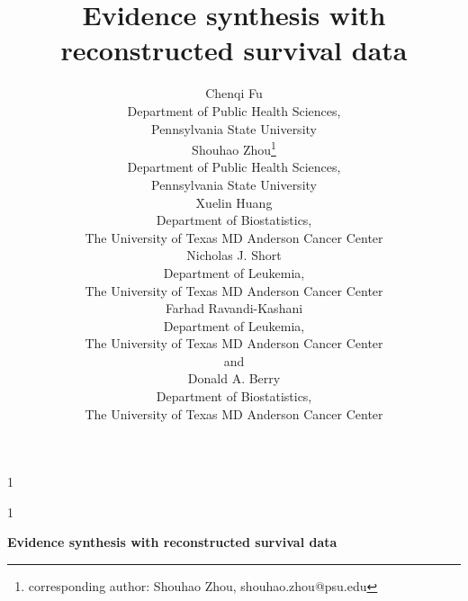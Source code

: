\documentclass[12pt]{article}
\theoremstyle{mystyle}
\newcommand{\blind}{1}
\begin{document}
%

\def\spacingset#1{\renewcommand{\baselinestretch}%
{#1}\small\normalsize} \spacingset{1}



\blind
{  
  \title{\bf Evidence synthesis with reconstructed survival data}
 \author{Chenqi Fu \hspace{.2cm} \\
    Department of Public Health Sciences,\\ Pennsylvania State University \vspace{.2cm} \\ 
    Shouhao Zhou\thanks{corresponding author: Shouhao Zhou, shouhao.zhou@psu.edu} \hspace{.2cm}\\
    Department of Public Health Sciences,\\ Pennsylvania State University \vspace{.2cm} \\ 
    Xuelin Huang \hspace{.2cm}\\
    Department of Biostatistics,\\ The University of Texas MD Anderson Cancer Center\vspace{.2cm} \\
    Nicholas J. Short \hspace{.2cm}\\
    Department of Leukemia,\\ The University of Texas MD Anderson Cancer Center\vspace{.2cm} \\
    Farhad Ravandi-Kashani \hspace{.2cm}\\
    Department of Leukemia,\\ The University of Texas MD Anderson Cancer Center \\
    and \\
    Donald A. Berry \hspace{.2cm}\\
    Department of Biostatistics,\\ The University of Texas MD Anderson Cancer Center }
  \maketitle
} \fi

\blind
{
  \bigskip
  \bigskip
  \bigskip
  \begin{center}
    {\LARGE\bf Evidence synthesis with reconstructed survival data}
\end{center}
  \medskip
} \fi
\end{document}

